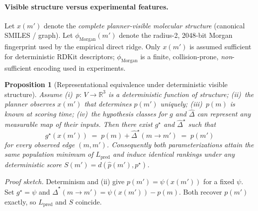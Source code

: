 \documentclass[journal=jcisd8,manuscript=article,email=false]{achemso}
\newtheorem{proposition}{Proposition}
\begin{document}
\paragraph{Visible structure versus experimental features.}
Let $x(m')$ denote the \emph{complete planner-visible molecular structure} (canonical SMILES / graph). Let $\phi_{\mathrm{Morgan}}(m')$ denote the radius-2, 2048-bit Morgan fingerprint used by the empirical direct ridge. Only $x(m')$ is assumed sufficient for deterministic RDKit descriptors; $\phi_{\mathrm{Morgan}}$ is a finite, collision-prone, \emph{non}-sufficient encoding used in experiments.

\begin{proposition}[Representational equivalence under deterministic visible structure]
\label{prop:equiv}
Assume (i)~$p{:}\,V\!\to\!\mathbb{R}^{3}$ is a deterministic function of structure; (ii)~the planner observes $x(m')$ that determines $p(m')$ uniquely; (iii)~$p(m)$ is known at scoring time; (iv)~the hypothesis classes for $g$ and $\widehat{\Delta}$ can represent any measurable map of their inputs. Then there exist $g^\star$ and $\widehat{\Delta}^\star$ such that
\[
g^\star\!\left(x(m')\right)
\;=\;
p(m)+\widehat{\Delta}^\star(m\!\to\!m')
\;=\;
p(m')
\]
for every observed edge $(m,m')$. Consequently both parameterizations attain the same population minimum of $L_{\mathrm{pred}}$ and induce identical rankings under any deterministic score $S(m')=d(\widehat p(m'),p^\star)$.
\end{proposition}

\noindent\textit{Proof sketch.}
Determinism and (ii) give $p(m')=\psi\!\left(x(m')\right)$ for a fixed $\psi$. Set $g^\star=\psi$ and $\widehat{\Delta}^\star(m\!\to\!m')=\psi\!\left(x(m')\right)-p(m)$. Both recover $p(m')$ exactly, so $L_{\mathrm{pred}}$ and $S$ coincide.
\end{document}
